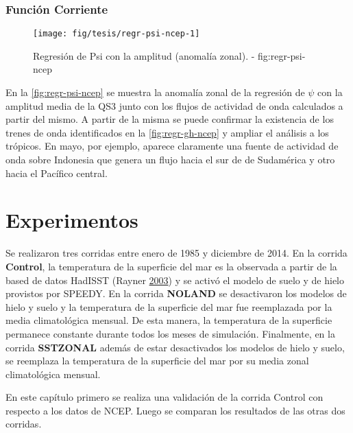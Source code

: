 \documentclass[spanish,a4paper,12p]{book}
\begin{document}
\subsection{Función Corriente}\label{funcion-corriente-1}

\begin{landscape}\begin{figure}

{\centering \texttt{[image: fig/tesis/regr-psi-ncep-1]} 

}

\caption{Regresión de Psi con la amplitud (anomalía zonal). - fig:regr-psi-ncep}\label{fig:regr-psi-ncep}
\end{figure}
\end{landscape}

En la \autoref{fig:regr-psi-ncep} se muestra la anomalía zonal de la
regresión de \(\psi\) con la amplitud media de la QS3 junto con los
flujos de actividad de onda calculados a partir del mismo. A partir de
la misma se puede confirmar la existencia de los trenes de onda
identificados en la \autoref{fig:regr-gh-ncep} y ampliar el análisis a
los trópicos. En mayo, por ejemplo, aparece claramente una fuente de
actividad de onda sobre Indonesia que genera un flujo hacia el sur de de
Sudamérica y otro hacia el Pacífico central.

\chapter{Experimentos}\label{experimentos}

Se realizaron tres corridas entre enero de 1985 y diciembre de 2014. En
la corrida \textbf{Control}, la temperatura de la superficie del mar es
la observada a partir de la based de datos HadISST (Rayner
\protect\hyperlink{ref-Rayner2003}{2003}) y se activó el modelo de suelo
y de hielo provistos por SPEEDY. En la corrida \textbf{NOLAND} se
desactivaron los modelos de hielo y suelo y la temperatura de la
superficie del mar fue reemplazada por la media climatológica mensual.
De esta manera, la temperatura de la superficie permanece constante
durante todos los meses de simulación. Finalmente, en la corrida
\textbf{SSTZONAL} además de estar desactivados los modelos de hielo y
suelo, se reemplaza la temperatura de la superficie del mar por su media
zonal climatológica mensual.

En este capítulo primero se realiza una validación de la corrida Control
con respecto a los datos de NCEP. Luego se comparan los resultados de
las otras dos corridas.
\end{document}
